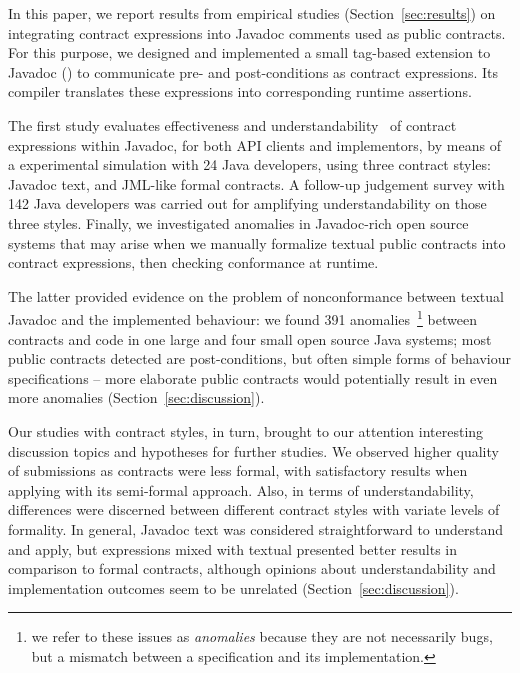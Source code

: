 In this paper, we report results from empirical studies (Section~\ref{sec:results}) on integrating contract expressions into Javadoc comments used as public contracts. 
For this purpose, we designed and implemented a small tag-based extension to Javadoc (\contractjdoc{}) to communicate pre- and post-conditions as contract expressions.
Its compiler translates these expressions into corresponding runtime assertions.

The first study evaluates effectiveness and understandability~\cite{} of contract expressions within Javadoc, for both API clients and implementors, by means of a experimental simulation with 24 Java developers, using three contract styles: Javadoc text, \contractjdoc{} and JML-like formal contracts. 
A follow-up judgement survey with 142 Java developers was carried out for amplifying understandability on those three styles.
Finally, we investigated anomalies in Javadoc-rich open source systems that may arise when we manually formalize textual public contracts into contract expressions, then checking conformance at runtime.

The latter provided evidence on the problem of nonconformance between textual Javadoc and the implemented behaviour: we found 391 anomalies~\footnote{we refer to these issues as \emph{anomalies} because they are not necessarily bugs, but a mismatch between a specification and its implementation.} between contracts and code in one large and four small open source Java systems; most public contracts detected are post-conditions, but often simple forms of behaviour specifications -- more elaborate public contracts would potentially result in even more anomalies (Section~\ref{sec:discussion}).

Our studies with contract styles, in turn, brought to our attention interesting discussion topics and hypotheses for further studies. 
We observed higher quality of submissions as contracts were less formal, with satisfactory results when applying \contractjdoc{} with its semi-formal approach. Also, in terms of understandability, differences were discerned between different contract styles with variate levels of formality.
In general, Javadoc text was considered straightforward to understand and apply, but \contractjdoc{} expressions mixed with textual presented better results in comparison to formal contracts, although opinions about understandability and implementation outcomes seem to be unrelated (Section~\ref{sec:discussion}).

